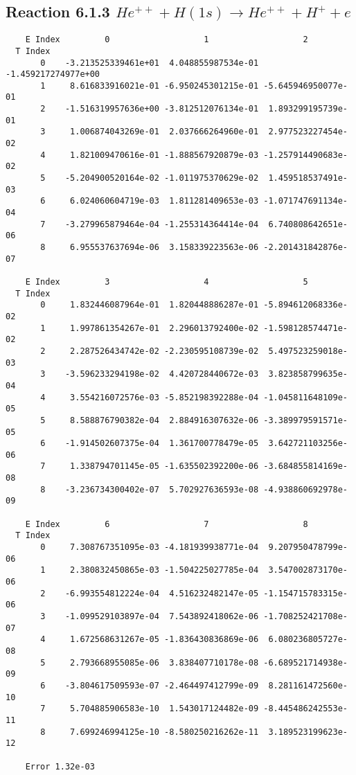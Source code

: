 \documentclass[12pt]{article}
\begin{document}
                               


\newpage
\subsection{
Reaction 6.1.3 $   He^{++} + H(1s) \rightarrow He^{++} + H^+ + e$}

\begin{small}\begin{verbatim}
    E Index         0                   1                   2
  T Index
       0    -3.213525339461e+01  4.048855987534e-01 -1.459217274977e+00
       1     8.616833916021e-01 -6.950245301215e-01 -5.645946950077e-01
       2    -1.516319957636e+00 -3.812512076134e-01  1.893299195739e-01
       3     1.006874043269e-01  2.037666264960e-01  2.977523227454e-02
       4     1.821009470616e-01 -1.888567920879e-03 -1.257914490683e-02
       5    -5.204900520164e-02 -1.011975370629e-02  1.459518537491e-03
       6     6.024060604719e-03  1.811281409653e-03 -1.071747691134e-04
       7    -3.279965879464e-04 -1.255314364414e-04  6.740808642651e-06
       8     6.955537637694e-06  3.158339223563e-06 -2.201431842876e-07

    E Index         3                   4                   5
  T Index
       0     1.832446087964e-01  1.820448886287e-01 -5.894612068336e-02
       1     1.997861354267e-01  2.296013792400e-02 -1.598128574471e-02
       2     2.287526434742e-02 -2.230595108739e-02  5.497523259018e-03
       3    -3.596233294198e-02  4.420728440672e-03  3.823858799635e-04
       4     3.554216072576e-03 -5.852198392288e-04 -1.045811648109e-05
       5     8.588876790382e-04  2.884916307632e-06 -3.389979591571e-05
       6    -1.914502607375e-04  1.361700778479e-05  3.642721103256e-06
       7     1.338794701145e-05 -1.635502392200e-06 -3.684855814169e-08
       8    -3.236734300402e-07  5.702927636593e-08 -4.938860692978e-09

    E Index         6                   7                   8
  T Index
       0     7.308767351095e-03 -4.181939938771e-04  9.207950478799e-06
       1     2.380832450865e-03 -1.504225027785e-04  3.547002873170e-06
       2    -6.993554812224e-04  4.516232482147e-05 -1.154715783315e-06
       3    -1.099529103897e-04  7.543892418062e-06 -1.708252421708e-07
       4     1.672568631267e-05 -1.836430836869e-06  6.080236805727e-08
       5     2.793668955085e-06  3.838407710178e-08 -6.689521714938e-09
       6    -3.804617509593e-07 -2.464497412799e-09  8.281161472560e-10
       7     5.704885906583e-10  1.543017124482e-09 -8.445486242553e-11
       8     7.699246994125e-10 -8.580250216262e-11  3.189523199623e-12

    Error 1.32e-03
\end{verbatim}\end{small}
\end{document}

